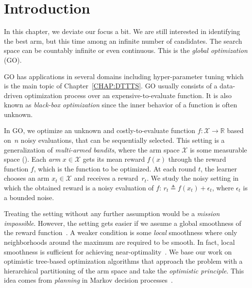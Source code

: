 \section{Introduction}\label{sec:gpo.intro}

In this chapter, we deviate our focus a bit. We are still interested in identifying the best arm, but this time among an infinite number of candidates. The search space can be countably infinite or even continuous. This is the \emph{global optimization} (GO). 

GO has applications in several domains including hyper-parameter tuning \citep{jamieson2016hyperband, li2017hyperband,samothrakis2013} which is the main topic of Chapter~\ref{CHAP:DTTTS}. GO usually consists of a data-driven optimization process over an expensive-to-evaluate function. It is also known as \emph{black-box optimization} since the inner behavior of a function is often unknown.

In GO, we optimize an unknown and costly-to-evaluate function $f: \mathcal{X} \rightarrow \mathbb{R}$ based on~$n$ noisy evaluations, that can be sequentially selected. This setting is a generalization of \textit{multi-armed bandits}, where the arm space $\mathcal{X}$ is some measurable space (\citealt{bubeck2011pure}). Each \emph{arm} $x \in \mathcal{X}$ gets its mean reward $f(x)$ through the reward function $f$, which is  the function to be optimized. At each round $t$, the learner chooses an arm $x_t \in \mathcal{X}$ and receives a reward~$r_t$. We study the noisy setting in which the obtained reward is a noisy evaluation of $f$: $r_t \triangleq f(x_t) + \epsilon_t$, where $\epsilon_t$ is a bounded noise.

Treating the setting without any further assumption would be a \emph{mission impossible}. However, the setting gets easier if we assume a global smoothness of the reward function~\citep{agrawal1995continuum,kleinberg2004nearly,kleinberg2008multi,cope2009,auer2007improved,slivkins2011taxonomy,kleinberg2013}. A weaker condition is some \emph{local} smoothness where only neighborhoods around the maximum are required to be smooth.  In fact, local smoothness is sufficient for achieving near-optimality~\citep{valko2013stosoo,azar2014online,grill2015poo,bull2015adaptive}.
We base our work on optimistic tree-based optimization algorithms \citep{munos2011soo,valko2013stosoo,preux2014bandits,azar2014online} that approach the problem with a hierarchical partitioning of the arm space and take the \textit{optimistic principle}. This idea comes from \textit{planning} in Markov decision processes~\citep{kocsis2006bandit,munos2014,grill2016trail}.

